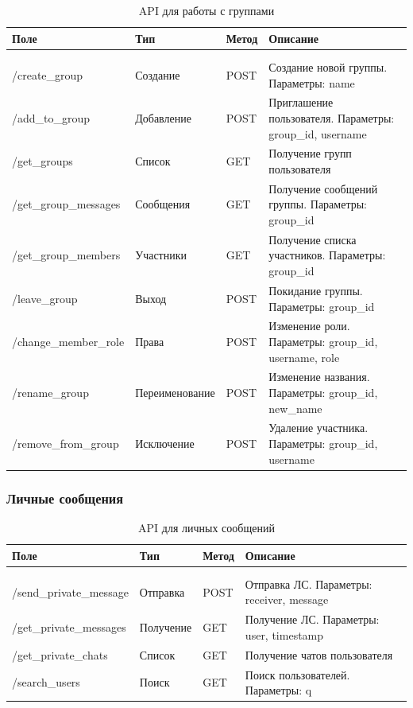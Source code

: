 \begin{xltabular}{\textwidth}{|l|l|p{1.7cm}|X|}
	\caption{API для работы с группами}\label{tab:groups_api} \\ \hline
	\centrow Поле & \centrow Тип & \centrow Метод & \centrow Описание \\ \hline
	 &  &  &  \\ \hline
	\endfirsthead
	 &  &  &  \\ \hline
	\finishhead
	/create\_group & Создание & POST & Создание новой группы. Параметры: name \\ \hline 
	/add\_to\_group & Добавление & POST & Приглашение пользователя. Параметры: group\_id, username \\ \hline 
	/get\_groups & Список & GET & Получение групп пользователя \\ \hline 
	/get\_group\_messages & Сообщения & GET & Получение сообщений группы. Параметры: group\_id \\ \hline 
	/get\_group\_members & Участники & GET & Получение списка участников. Параметры: group\_id \\ \hline 
	/leave\_group & Выход & POST & Покидание группы. Параметры: group\_id \\ \hline 
	/change\_member\_role & Права & POST & Изменение роли. Параметры: group\_id, username, role \\ \hline 
	/rename\_group & Переименование & POST & Изменение названия. Параметры: group\_id, new\_name \\ \hline 
	/remove\_from\_group & Исключение & POST & Удаление участника. Параметры: group\_id, username \\ \hline 
\end{xltabular}

\subsubsection{Личные сообщения}

\begin{xltabular}{\textwidth}{|l|l|p{1.7cm}|X|}
	\caption{API для личных сообщений}\label{tab:private_api} \\ \hline
	\centrow Поле & \centrow Тип & \centrow Метод & \centrow Описание \\ \hline
	 &  &  &  \\ \hline
	\endfirsthead
	 &  &  &  \\ \hline
	\finishhead
	/send\_private\_message & Отправка & POST & Отправка ЛС. Параметры: receiver, message \\ \hline 
	/get\_private\_messages & Получение & GET & Получение ЛС. Параметры: user, timestamp \\ \hline 
	/get\_private\_chats & Список & GET & Получение чатов пользователя \\ \hline 
	/search\_users & Поиск & GET & Поиск пользователей. Параметры: q \\ \hline 
\end{xltabular}


